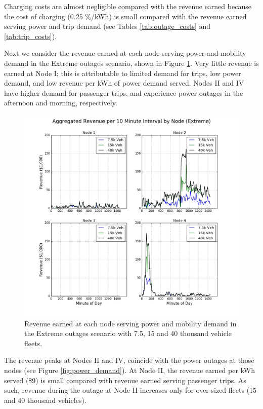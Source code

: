 \documentclass[journal]{IEEEtran}
\begin{document}
Charging costs are almost negligible compared with the revenue earned because the cost of charging (0.25 \%/kWh) is small compared with the revenue earned serving power and trip demand (see Tables \ref{tab:outage_costs} and \ref{tab:trip_costs}).

Next we consider the revenue earned at each node serving power and mobility demand in the Extreme outages scenario, shown in Figure \ref{fig:node_revenue}. Very little revenue is earned at Node I; this is attributable to limited demand for trips, low power demand, and low revenue per kWh of power demand served. Nodes II and IV have higher demand for passenger trips, and experience power outages in the afternoon and morning, respectively.

\begin{figure}[!htbp]
  \includegraphics[width=\linewidth]{plots/aggregated-revenue-by-node.jpg}
  \caption{Revenue earned at each node serving power and mobility demand in the Extreme outages scenario with 7.5, 15 and 40 thousand vehicle fleets.}
  \label{fig:node_revenue}
\end{figure}

The revenue peaks at Nodes II and IV, coincide with the power outages at those nodes (see Figure \ref{fig:power_demand}). At Node II, the revenue earned per kWh served (\$9) is small compared with revenue earned serving passenger trips. As such, revenue during the outage at Node II increases only for over-sized fleets (15 and 40 thousand vehicles). 
\end{document}
